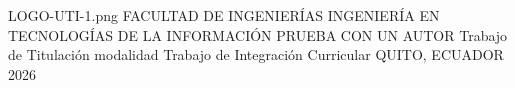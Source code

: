 \documentclass[12pt,a4paper,oneside]{report}
\begin{document}
\UTIPortada
{LOGO-UTI-1.png}
{FACULTAD DE INGENIERÍAS}
{INGENIERÍA EN TECNOLOGÍAS DE LA INFORMACIÓN}
{PRUEBA CON UN AUTOR}
{Trabajo de Titulación modalidad Trabajo de Integración Curricular}
{}
{}
{QUITO, ECUADOR}
{2026}
\UTIFrontMatter


\end{document}
